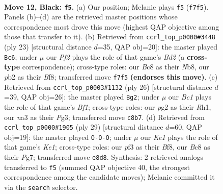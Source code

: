\documentclass[11pt]{article}
\begin{document}
\clearpage

\begin{figure}[p]\centering
\begin{subfigure}{0.46\textwidth}\centering
\resizebox{\linewidth}{!}{%
\newchessgame
\chessboard[
  setfen={r1b1kb1r/p3nppp/2pp4/8/8/N2B1P2/PPP3PP/R1B1K2R b KQkq - 3 12},
  showmover=false,
  pgfstyle=straightmove, color=movearrow, markmove={f7-f5}
]}
\caption{}
\end{subfigure}\hfill
\begin{subfigure}{0.46\textwidth}\centering
\resizebox{\linewidth}{!}{%
\newchessgame
\chessboard[
  setfen={rn1k1b1r/1p1b1ppp/p3p3/8/6P1/2N1B2P/PPP2P2/R3KB1R b KQ - 2 12},
  showmover=false,
  pgfstyle=straightmove, color=movearrow, markmove={d7-c6}
]}
\caption{}
\end{subfigure}
\\[4pt]
\begin{subfigure}{0.46\textwidth}\centering
\resizebox{\linewidth}{!}{%
\newchessgame
\chessboard[
  setfen={r3kb1r/5ppp/1nppb3/p7/7P/6P1/PPPN1P2/R1B1KB1R w KQkq - 0 14},
  showmover=false,
  pgfstyle=straightmove, color=movearrow, markmove={f1-g2}
]}
\caption{}
\end{subfigure}\hfill
\begin{subfigure}{0.46\textwidth}\centering
\resizebox{\linewidth}{!}{%
\newchessgame
\chessboard[
  setfen={r3kb1r/p1pn2pp/1p2p3/8/4P3/4BP2/PP4PP/2R1K1NR b Kkq - 1 15},
  showmover=false,
  pgfstyle=straightmove, color=movearrow, markmove={e8-c8}
]}
\caption{}
\end{subfigure}
\caption{\textbf{Move 12, Black: \texttt{f5}.} (a) Our position; Melanie plays \texttt{f5} (\texttt{f7f5}). Panels (b)--(d) are the retrieved master positions whose correspondence most drove this move (highest QAP objective among those that transfer to it). (b) Retrieved from \texttt{ccrl\_top\_p0000\#3448} (ply 23) [structural distance $d$=35, QAP obj=20]: the master played \texttt{Bc6}; under $\mu$ our \emph{Pf2} plays the role of that game's \emph{Bd2} (a \textbf{cross-type} correspondence); cross-type roles: our \emph{B}c8 as their \emph{N}b8, our \emph{p}b2 as their \emph{B}f8; transferred move \texttt{f7f5} \textbf{(endorses this move)}. (c) Retrieved from \texttt{ccrl\_top\_p0003\#1132} (ply 26) [structural distance $d$=39, QAP obj=26]: the master played \texttt{Bg2}; under $\mu$ our \emph{Bc1} plays the role of that game's \emph{Bf1}; cross-type roles: our \emph{p}g2 as their \emph{R}h1, our \emph{n}a3 as their \emph{P}g3; transferred move \texttt{c8b7}. (d) Retrieved from \texttt{ccrl\_top\_p0000\#1905} (ply 29) [structural distance $d$=60, QAP obj=19]: the master played \texttt{O-O-O}; under $\mu$ our \emph{Ke1} plays the role of that game's \emph{Ke1}; cross-type roles: our \emph{p}f3 as their \emph{B}f8, our \emph{B}c8 as their \emph{P}g7; transferred move \texttt{e8d8}. Synthesis: 2 retrieved analogs transferred to \texttt{f5} (summed QAP objective 40, the strongest correspondence among the candidate moves); Melanie committed it via the \texttt{search} selector.}
\label{fig:thought-m23}
\end{figure}
\end{document}
